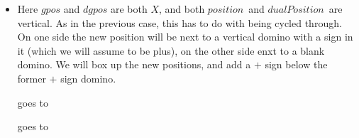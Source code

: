 \documentclass[12pt]{article}
\numberwithin{equation}{section}
\newcommand{\verticalDominoRS}[3]{\filldraw [dominoRSStyle] (#2 - 1 + \eps,  #1 - 1 + \eps) rectangle + (1 - \teps,2 -\teps) node [dominoText] {$#3$};}
\newcommand{\verticalDominoRSShift}[4]{\filldraw [dominoRSStyle] (#2 - 1 + #4 + \eps,  #1 - 1 + \eps) rectangle + (1 - \teps,2 -\teps) node [dominoText] {$#3$};}
\newcommand{\pos}{$position$}
\newcommand{\dpos}{$dualPosition$}
\begin{document}
\begin{itemize}
    \item Here $gpos$ and $dgpos$ are both $X$, and both \pos\ and \dpos\ are vertical.
    As in the previous case, this has to do with being cycled through.
    On one side the new position will be next to a vertical domino with a sign in it (which we will assume to be plus), on the other side enxt to a blank domino.
    We will box up the new positions, and add a $+$ sign below the former $+$ sign domino.
    \begin{figure}[H]
      \centering
    \end{figure}
    goes to
    \begin{figure}[H]
      \centering
    \end{figure}
    \begin{figure}[H]
      \centering
    \end{figure}
    goes to
    \begin{figure}[H]
      \centering
    \end{figure}


\end{itemize}
\end{document}
